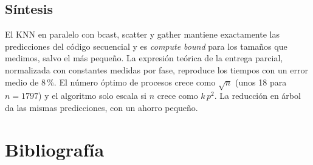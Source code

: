 \documentclass[11pt,a4paper]{article}
\begin{document}
\subsection{Síntesis}

El KNN en paralelo con bcast, scatter y gather mantiene exactamente las predicciones del código secuencial y es \textit{compute bound} para los tamaños que medimos, salvo el más pequeño. La expresión teórica de la entrega parcial, normalizada con constantes medidas por fase, reproduce los tiempos con un error medio de 8\,\%. El número óptimo de procesos crece como $\sqrt{n}$ (unos 18 para $n = 1797$) y el algoritmo solo escala si $n$ crece como $k\,p^2$. La reducción en árbol da las mismas predicciones, con un ahorro pequeño.

\section{Bibliografía}
\end{document}
